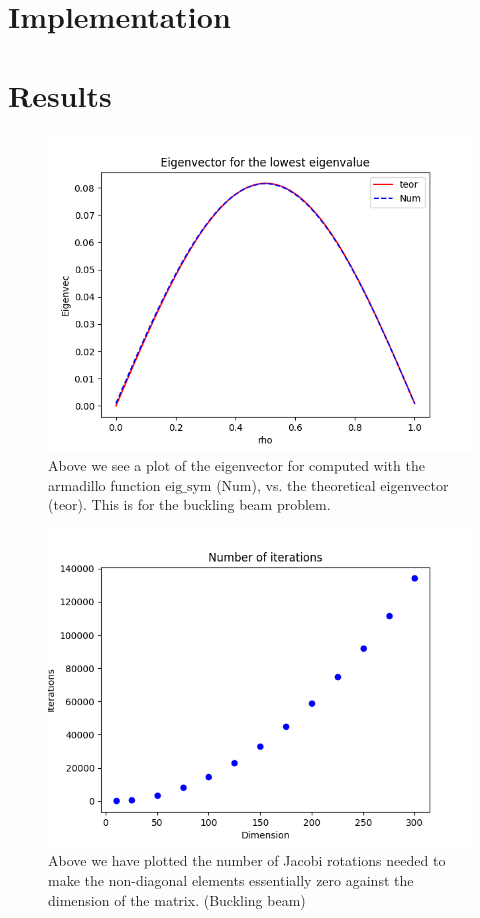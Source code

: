 \documentclass[norsk,a4paper,12pt]{article}
\begin{document}
\section{Implementation}

\section{Results}
\begin{figure}[H]
	\centering
	\includegraphics[width=\linewidth]{Egenvektorer1.png}
	\caption{Above we see a plot of the eigenvector for computed with the armadillo function $\text{eig\_sym}$ ($\text{Num}$), vs. the theoretical eigenvector (teor). This is for the buckling beam problem.}
	\label{fig:egen1}
\end{figure}

\begin{figure}[H]
	\centering
	\includegraphics[width=\linewidth]{Iterasjoner.png}
	\caption{Above we have plotted the number of Jacobi rotations needed to make the non-diagonal elements essentially zero against the dimension of the matrix. (Buckling beam)}
	\label{fig:iter}
\end{figure}
\end{document}
